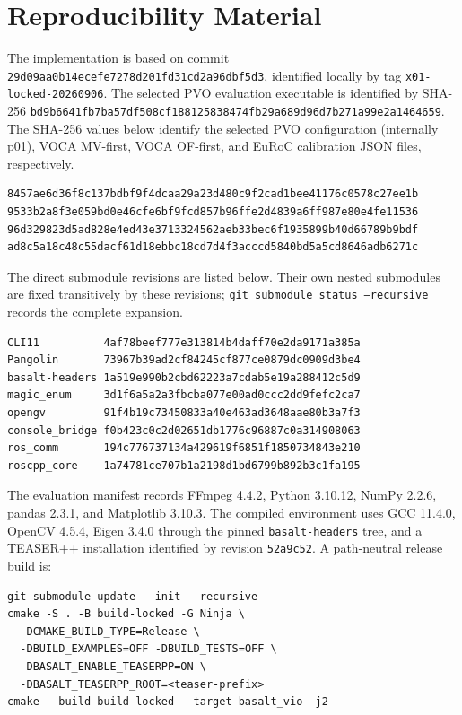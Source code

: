 \chapter{Reproducibility Material}\label{appendix:reproducibility}

The implementation is based on commit
\texttt{29d09aa0b14ecefe7278d201fd31cd2a96dbf5d3}, identified locally by tag
\texttt{x01-locked-20260906}. The selected PVO evaluation executable is
identified by SHA-256
\texttt{bd9b6641fb7ba57df508cf188125838474fb29a689d96d7b271a99e2a1464659}.
The SHA-256 values below identify the selected PVO configuration (internally p01),
VOCA MV-first, VOCA OF-first, and EuRoC calibration JSON files, respectively.

\begin{lstlisting}[basicstyle=\ttfamily\small]
8457ae6d36f8c137bdbf9f4dcaa29a23d480c9f2cad1bee41176c0578c27ee1b
9533b2a8f3e059bd0e46cfe6bf9fcd857b96ffe2d4839a6ff987e80e4fe11536
96d329823d5ad828e4ed43e3713324562aeb33bec6f1935899b40d66789b9bdf
ad8c5a18c48c55dacf61d18ebbc18cd7d4f3acccd5840bd5a5cd8646adb6271c
\end{lstlisting}

The direct submodule revisions are listed below. Their own nested submodules are
fixed transitively by these revisions; \texttt{git submodule status
--recursive} records the complete expansion.

\begin{lstlisting}
CLI11          4af78beef777e313814b4daff70e2da9171a385a
Pangolin       73967b39ad2cf84245cf877ce0879dc0909d3be4
basalt-headers 1a519e990b2cbd62223a7cdab5e19a288412c5d9
magic_enum     3d1f6a5a2a3fbcba077e00ad0ccc2dd9fefc2ca7
opengv         91f4b19c73450833a40e463ad3648aae80b3a7f3
console_bridge f0b423c0c2d02651db1776c96887c0a314908063
ros_comm       194c776737134a429619f6851f1850734843e210
roscpp_core    1a74781ce707b1a2198d1bd6799b892b3c1fa195
\end{lstlisting}

The evaluation manifest records FFmpeg 4.4.2, Python 3.10.12, NumPy 2.2.6,
pandas 2.3.1, and Matplotlib 3.10.3. The compiled environment uses GCC 11.4.0,
OpenCV 4.5.4, Eigen 3.4.0 through the pinned \texttt{basalt-headers} tree, and a
TEASER++ installation identified by revision \texttt{52a9c52}. A path-neutral
release build is:

\begin{lstlisting}
git submodule update --init --recursive
cmake -S . -B build-locked -G Ninja \
  -DCMAKE_BUILD_TYPE=Release \
  -DBUILD_EXAMPLES=OFF -DBUILD_TESTS=OFF \
  -DBASALT_ENABLE_TEASERPP=ON \
  -DBASALT_TEASERPP_ROOT=<teaser-prefix>
cmake --build build-locked --target basalt_vio -j2
\end{lstlisting}

